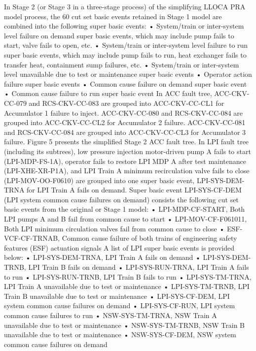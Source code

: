 In Stage 2 (or Stage 3 in a three-stage process) of the simplifying LLOCA PRA model process, the 60 cut set basic events retained in Stage 1 model are combined into the following super basic events:
•	System/train or inter-system level failure on demand super basic events, which may include pump fails to start, valve fails to open, etc.
•	System/train or inter-system level failure to run super basic events, which may include pump fails to run, heat exchanger fails to transfer heat, containment sump failures, etc.
•	System/train or inter-system level unavailable due to test or maintenance super basic events
•	Operator action failure super basic events
•	Common cause failure on demand super basic event
•	Common cause failure to run super basic event
In ACC fault tree, ACC-CKV-CC-079 and RCS-CKV-CC-083 are grouped into ACC-CKV-CC-CL1 for Accumulator 1 failure to inject. ACC-CKV-CC-080 and RCS-CKV-CC-084 are grouped into ACC-CKV-CC-CL2 for Accumulator 2 failure. ACC-CKV-CC-081 and RCS-CKV-CC-084 are grouped into ACC-CKV-CC-CL3 for Accumulator 3 failure. Figure 5 presents the simplified Stage 2 ACC fault tree.
In LPI fault tree (including its subtrees), low pressure injection motor-driven pump A fails to start (LPI-MDP-FS-1A), operator fails to restore LPI MDP A after test maintenance (LPI-XHE-XR-P1A), and LPI Train A minimum recirculation valve fails to close (LPI-MOV-OO-F0610) are grouped into one super basic event, LPI-SYS-DEM-TRNA for LPI Train A fails on demand. Super basic event LPI-SYS-CF-DEM (LPI system common cause failures on demand) consists the following cut set basic events from the original or Stage 1 model:
•	LPI-MDP-CF-START, Both LPI pumps A and B fail from common cause to start
•	LPI-MOV-CF-F061011, Both LPI minimum circulation valves fail from common cause to close
•	ESF-VCF-CF-TRNAB, Common cause failure of both trains of engineering safety features (ESF) actuation signals
A list of LPI super basic events is provided below: 
•	LPI-SYS-DEM-TRNA, LPI Train A fails on demand 
•	LPI-SYS-DEM-TRNB, LPI Train B fails on demand
•	LPI-SYS-RUN-TRNA, LPI Train A fails to run
•	LPI-SYS-RUN-TRNB, LPI Train B fails to run
•	LPI-SYS-TM-TRNA, LPI Train A unavailable due to test or maintenance
•	LPI-SYS-TM-TRNB, LPI Train B unavailable due to test or maintenance
•	LPI-SYS-CF-DEM, LPI system common cause failures on demand 
•	LPI-SYS-CF-RUN, LPI system common cause failures to run
•	NSW-SYS-TM-TRNA, NSW Train A unavailable due to test or maintenance
•	NSW-SYS-TM-TRNB, NSW Train B unavailable due to test or maintenance
•	NSW-SYS-CF-DEM, NSW system common cause failures on demand
